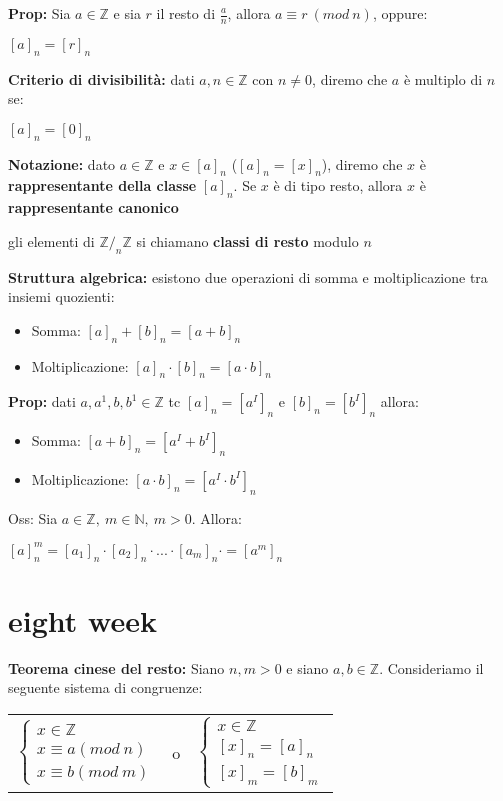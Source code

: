 \documentclass[11pt, letterpaper]{article}
\begin{document}
\newpage

\textbf{Prop:} Sia $a\in\mathbb{Z}$ e sia $r$ il resto di $\frac{a}{n}$, allora $a\equiv r\ (mod\ n)$, oppure:
\begin{center}
    $[a]_{n}=[r]_{n}$
\end{center}

\textbf{Criterio di divisibilità:} dati $a,n\in\mathbb{Z}$ con $n\neq 0$, diremo che $a$ è multiplo di $n$ se:
\begin{center}
    $[a]_{n}=[0]_{n}$
\end{center}

\textbf{Notazione:} dato $a\in\mathbb{Z}$ e $x\in [a]_{n}$ ($[a]_{n}=[x]_{n}$), diremo che $x$ è \textbf{rappresentante
della classe} $[a]_{n}$. Se $x$ è di tipo resto, allora $x$ è \textbf{rappresentante canonico}

gli elementi di $\mathbb{Z}/_{n}\mathbb{Z}$ si chiamano \textbf{classi di resto} modulo $n$

\textbf{Struttura algebrica:} esistono due operazioni di somma e moltiplicazione tra insiemi quozienti:
\begin{itemize}
    \item Somma: $[a]_{n}+[b]_{n}=[a+b]_{n}$
    \item Moltiplicazione: $[a]_{n}\cdot [b]_{n}=[a\cdot b]_{n}$
\end{itemize}

\textbf{Prop:} dati $a,a^{1},b,b^{1}\in\mathbb{Z}$ tc $[a]_{n}=[a^{I}]_{n}$ e $[b]_{n}=[b^{I}]_{n}$ allora:
\begin{itemize}
    \item Somma: $[a+b]_{n}=[a^{I}+b^{I}]_{n}$
    \item Moltiplicazione: $[a\cdot b]_{n}=[a^{I}\cdot b^{I}]_{n}$
\end{itemize}

Oss: Sia $a\in\mathbb{Z},\ m\in\mathbb{N},\ m>0$. Allora:
\begin{center}
    $[a]_{n}^{m}=[a_{1}]_{n}\cdot[a_{2}]_{n}\cdot ... \cdot[a_{m}]_{n}\cdot = [a^{m}]_{n}$
\end{center}

\newpage
\section{eight week}
\textbf{Teorema cinese del resto:} Siano $n,m>0$ e siano $a,b\in\mathbb{Z}$. Consideriamo il seguente
sistema di congruenze:
\begin{center}
    \begin{tabular}{ c c c }
        $\begin{cases}
            x\in\mathbb{Z}\\
            x\equiv a(mod\ n)\\
            x\equiv b(mod\ m)
        \end{cases}$
        & o &
        $\begin{cases}
            x\in\mathbb{Z}\\
            [x]_{n}=[a]_{n}\\
            [x]_{m}=[b]_{m}
        \end{cases}$
    \end{tabular}
\end{center}
\end{document}
